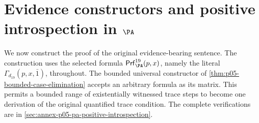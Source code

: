 \section{Evidence constructors and positive introspection in \(\PA\)}
\label{sec:p05-pa-positive-introspection}

We now construct the proof of the original evidence-bearing sentence. The
construction uses the selected formula
\(\mathsf{Prf}^{19}_{\PA}(p,x)\), namely the literal
\(\Gamma_{d_{19}}(p,x,\bar1)\), throughout.
The bounded universal constructor of
\cref{thm:p05-bounded-case-elimination} accepts an arbitrary formula as
its matrix. This permits a bounded range of existentially witnessed trace
steps to become one derivation of the original quantified trace condition.
The complete verifications are in
\cref{sec:annex-p05-pa-positive-introspection}.

